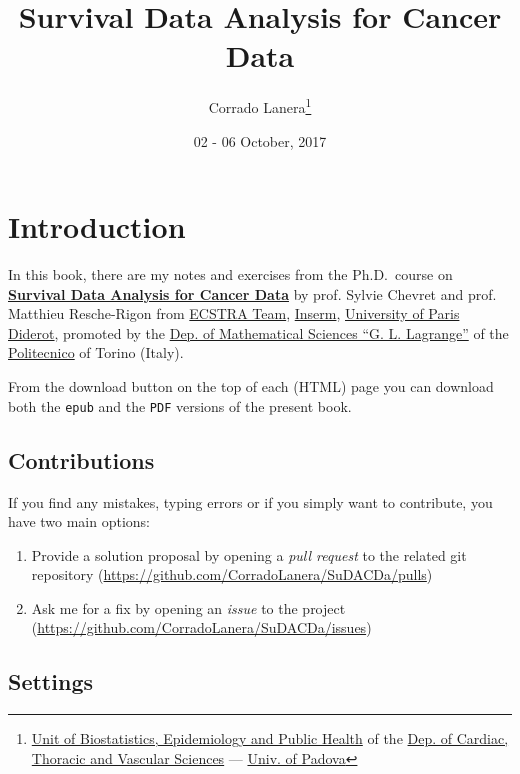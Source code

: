 \documentclass[]{book}
\title{Survival Data Analysis for Cancer Data}
\author{Corrado Lanera\footnote{\href{http://www.dctv.unipd.it/dipartimento/strutture/biostatistica}{Unit
  of Biostatistics, Epidemiology and Public Health} of the
  \href{http://www.dctv.unipd.it/}{Dep. of Cardiac, Thoracic and
  Vascular Sciences} --- \href{http://www.unipd.it/}{Univ. of Padova}}}
\date{02 - 06 October, 2017}
\providecommand{\tightlist}{%
  \setlength{\itemsep}{0pt}\setlength{\parskip}{0pt}}
\theoremstyle{definition}
\theoremstyle{definition}
\theoremstyle{definition}
\theoremstyle{remark}
\begin{document}
\maketitle

{
\setcounter{tocdepth}{1}
\tableofcontents
}
\chapter*{Introduction}\label{introduction}

In this book, there are my notes and exercises from the Ph.D.~course on
\href{http://www.politocomunica.polito.it/events/appuntamenti/(idnews)/9665}{\textbf{Survival
Data Analysis for Cancer Data}} by prof. Sylvie Chevret and prof.
Matthieu Resche-Rigon from \href{http://www.cress-umr1153.fr/}{ECSTRA
Team}, \href{https://www.inserm.fr/}{Inserm},
\href{https://www.univ-paris-diderot.fr/}{University of Paris Diderot},
promoted by the \href{http://www.disma.polito.it/}{Dep. of Mathematical
Sciences ``G. L. Lagrange''} of the
\href{http://www.polito.it/}{Politecnico} of Torino (Italy).

From the download button on the top of each (HTML) page you can download
both the \texttt{epub} and the \texttt{PDF} versions of the present
book.

\section*{Contributions}\label{contributions}

If you find any mistakes, typing errors or if you simply want to
contribute, you have two main options:

\begin{enumerate}
\def\labelenumi{\arabic{enumi}.}
\tightlist
\item
  Provide a solution proposal by opening a \emph{pull request} to the
  related git repository
  (\url{https://github.com/CorradoLanera/SuDACDa/pulls})
\item
  Ask me for a fix by opening an \emph{issue} to the project
  (\url{https://github.com/CorradoLanera/SuDACDa/issues})
\end{enumerate}

\section*{Settings}\label{settings}
\end{document}
